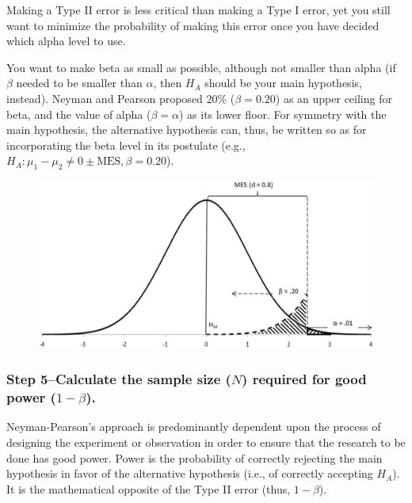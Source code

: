 \documentclass[
]{book}
\theoremstyle{definition}
\theoremstyle{definition}
\theoremstyle{definition}
\theoremstyle{definition}
\theoremstyle{remark}
\begin{document}
Making a Type II error is less critical than making a Type I error, yet you still want to minimize the probability of making this error once you have decided which alpha level to use.

You want to make beta as small as possible, although not smaller than alpha (if \(\beta\) needed to be smaller than \(\alpha\), then \(H_A\) should be your main hypothesis, instead). Neyman and Pearson proposed 20\% (\(\beta = 0.20\)) as an upper ceiling for beta, and the value of alpha (\(\beta = \alpha\)) as its lower floor. For symmetry with the main hypothesis, the alternative hypothesis can, thus, be written so as for incorporating the beta level in its postulate (e.g., \(H_A: \mu_1-\mu_2 \neq 0 \pm \mbox{MES}, \beta = 0.20\)).

\begin{figure}

{\centering \includegraphics[width=0.6\linewidth]{images/Perezgonzalez2015Fig4} 

}

\end{figure}

\hypertarget{step-5calculate-the-sample-size-n-required-for-good-power-1-beta.}{%
\subsubsection*{\texorpdfstring{Step 5--Calculate the sample size (\(N\)) required for good power (\(1-\beta\)).}{Step 5--Calculate the sample size (N) required for good power (1-\textbackslash beta).}}\label{step-5calculate-the-sample-size-n-required-for-good-power-1-beta.}}

Neyman-Pearson's approach is predominantly dependent upon the process of designing the experiment or observation in order to ensure that the research to be done has good power. Power is the probability of correctly rejecting the main hypothesis in favor of the alternative hypothesis (i.e., of correctly accepting \(H_A\)). It is the mathematical opposite of the Type II error (thus, \(1-\beta\)).
\end{document}
